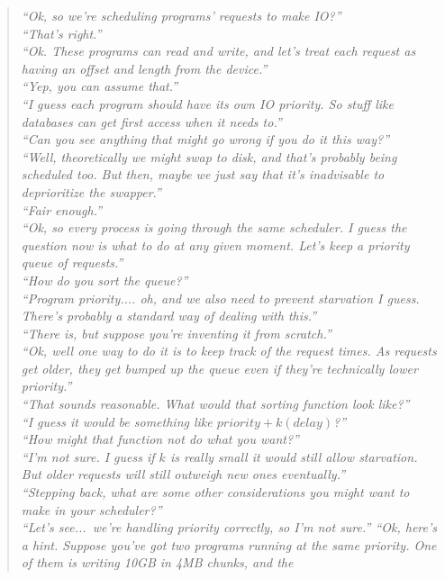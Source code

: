\documentclass{article}
\begin{document}
\begin{quote}
\em
``Ok, so we're scheduling programs' requests to make IO?'' \\
``That's right.'' \\
``Ok. These programs can read and write, and let's treat each request
  as having an offset and length from the device.'' \\
``Yep, you can assume that.'' \\
``I guess each program should have its own IO priority. So stuff like
  databases can get first access when it needs to.'' \\
``Can you see anything that might go wrong if you do it this way?'' \\
``Well, theoretically we might swap to disk, and that's probably being
  scheduled too. But then, maybe we just say that it's inadvisable to
  deprioritize the swapper.'' \\
``Fair enough.'' \\
``Ok, so every process is going through the same scheduler. I guess the
  question now is what to do at any given moment. Let's keep a priority
  queue of requests.'' \\
``How do you sort the queue?'' \\
``Program priority.... oh, and we also need to prevent starvation I
  guess. There's probably a standard way of dealing with this.'' \\
``There is, but suppose you're inventing it from scratch.'' \\
``Ok, well one way to do it is to keep track of the request times. As
  requests get older, they get bumped up the queue even if they're
  technically lower priority.'' \\
``That sounds reasonable. What would that sorting function look like?''
\\
``I guess it would be something like $priority + k(delay)$?'' \\
``How might that function not do what you want?'' \\
``I'm not sure. I guess if $k$ is really small it would still allow
  starvation. But older requests will still outweigh new ones
  eventually.'' \\
``Stepping back, what are some other considerations you might want to
  make in your scheduler?'' \\
``Let's see...~we're handling priority correctly, so I'm not sure.''
``Ok, here's a hint. Suppose you've got two programs running at the
  same priority. One of them is writing 10GB in 4MB chunks, and the

\end{quote}
\end{document}
